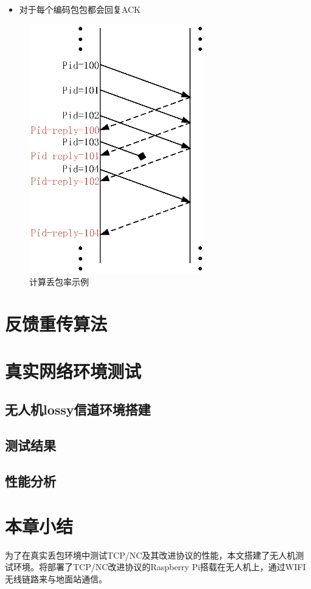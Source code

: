 \begin{itemize}[leftmargin=.5in]
	\item 对于每个编码包包都会回复ACK
\end{itemize}
\begin{figure}[htbp]
	\centering
	\includegraphics[width=3in]{figures/diubao.eps}
	\caption{计算丢包率示例}
	\label{DIUBAO_EPS}
\end{figure}
\section{反馈重传算法}
\section{真实网络环境测试}
\subsection{无人机lossy信道环境搭建}
\subsection{测试结果}
\subsection{性能分析}
\section{本章小结}
为了在真实丢包环境中测试TCP/NC及其改进协议的性能，本文搭建了无人机测试环境。将部署了TCP/NC改进协议的Raspberry Pi搭载在无人机上，通过WIFI无线链路来与地面站通信。 